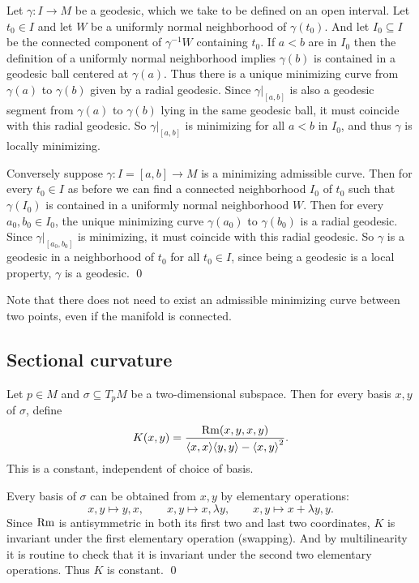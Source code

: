     Let $\gamma\colon I\to M$ be a geodesic, which we take to be defined on an open interval.
    Let $t_0\in I$ and let $W$ be a uniformly normal neighborhood of $\gamma(t_0)$.
    And let $I_0\subseteq I$ be the connected component of $\gamma^{-1}W$ containing $t_0$.
    If $a<b$ are in $I_0$ then the definition of a uniformly normal neighborhood implies $\gamma(b)$ is contained in a geodesic ball
    centered at $\gamma(a)$.
    Thus there is a unique minimizing curve from $\gamma(a)$ to $\gamma(b)$ given by a radial geodesic.
    Since $\gamma|_{[a,b]}$ is also a geodesic segment from $\gamma(a)$ to $\gamma(b)$ lying in the same geodesic ball, it must coincide
    with this radial geodesic.
    So $\gamma|_{[a,b]}$ is minimizing for all $a<b$ in $I_0$, and thus $\gamma$ is locally minimizing.

    Conversely suppose $\gamma\colon I=[a,b]\to M$ is a minimizing admissible curve.
    Then for every $t_0\in I$ as before we can find a connected neighborhood $I_0$ of $t_0$ such that $\gamma(I_0)$ is contained
    in a uniformly normal neighborhood $W$.
    Then for every $a_0,b_0\in I_0$, the unique minimizing curve $\gamma(a_0)$ to $\gamma(b_0)$ is a radial geodesic.
    Since $\gamma|_{[a_0,b_0]}$ is minimizing, it must coincide with this radial geodesic.
    So $\gamma$ is a geodesic in a neighborhood of $t_0$ for all $t_0\in I$, since being a geodesic is a local property, $\gamma$ is a geodesic.
    \qed

\eproof

Note that there does not need to exist an admissible minimizing curve between two points, even if the manifold is connected.

\subsection{Sectional curvature}

\blemm

    Let $p\in M$ and $\sigma\subseteq T_pM$ be a two-dimensional subspace.
    Then for every basis $x,y$ of $\sigma$, define
    $$ K(x,y) = {{{\rm Rm}(x,y,x,y)}\over{\mathopen{}\mathclose{\left<x,x\right>}\mathopen{}\mathclose{\left<y,y\right>}-\mathopen{}\mathclose{\left<x,y\right>}^2}} . $$
    This is a constant, independent of choice of basis.

\elemm

\bproof

    Every basis of $\sigma$ can be obtained from $x,y$ by elementary operations:
    $$ x,y\mapsto y,x,\qquad x,y\mapsto x,\lambda y,\qquad x,y\mapsto x+\lambda y,y . $$
    Since ${\rm Rm}$ is antisymmetric in both its first two and last two coordinates, $K$ is invariant under the first elementary operation
    (swapping).
    And by multilinearity it is routine to check that it is invariant under the second two elementary operations.
    Thus $K$ is constant.
    \qed

